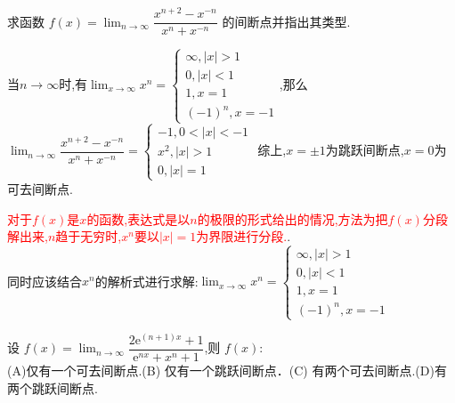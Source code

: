 \documentclass[8pt a4paper, oneside, UTF8]{ctexbook}
\begin{document}
\begin{sloppypar}
\begin{solution}
    \end{solution}
    \begin{problem}
        求函数 $f(x)=\lim_{n\to\infty}\dfrac{x^{n+2}-x^{-n}}{x^n+x^{-n}}$ 的间断点并指出其类型.
    \end{problem}
    \begin{solution}
        当$n \to \infty$时,有$\lim_{x \to \infty}x^n=\begin{cases}
            \infty ,|x|>1\\ 
            0,|x|<1\\1,
            x=1\\
            (-1)^n,x=-1
        \end{cases}$,那么$\lim_{n\to\infty}\dfrac{x^{n+2}-x^{-n}}{x^n+x^{-n}}=
        \begin{cases} 
            -1,0<|x|<-1\\x^2,|x|>1\\0,|x|=1
        \end{cases}$
    综上,$x= \pm 1$为跳跃间断点,$x=0$为可去间断点.
    \end{solution}
    \begin{note}
        \textcolor{red}{对于$f(x)$是$x$的函数,表达式是以$n$的极限的形式给出的情况,方法为把$f(x)$分段解出来,$n$趋于无穷时,$x^n$要以$|x|=1$为界限进行分段.}.\\同时应该结合$x^n$的解析式进行求解:$\lim_{x \to \infty}x^n=\begin{cases}
            \infty ,|x|>1\\ 
            0,|x|<1\\1,
            x=1\\
            (-1)^n,x=-1
        \end{cases}$
    \end{note}
    \begin{problem}
        设 $f(x)=\lim_{n\to\infty}\dfrac{2\mathrm{e}^{(n+1)x}+1}{\mathrm{e}^{nx}+x^{n}+1}$,则 $f(x):$  \\
        (A)仅有一个可去间断点.\quad(B) 仅有一个跳跃间断点．\quad(C) 有两个可去间断点.\quad(D)有两个跳跃间断点.
    \end{problem}
\end{sloppypar}
\end{document}
